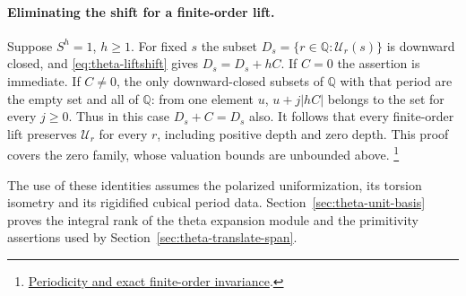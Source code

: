 \paragraph{Eliminating the shift for a finite-order lift.}
Suppose \(S^h=1\), \(h\ge1\). For fixed \(s\) the subset
\(D_s=\{r\in\mathbb Q:\mathcal U_r(s)\}\) is downward closed,
and \eqref{eq:theta-liftshift} gives \(D_s=D_s+hC\).
If \(C=0\) the assertion is immediate. If \(C\ne0\), the only
downward-closed subsets of \(\mathbb Q\) with that period are the
empty set and all of \(\mathbb Q\): from one element \(u\),
\(u+j|hC|\) belongs to the set for every \(j\ge0\). Thus in this
case \(D_s+C=D_s\) also. It follows that every finite-order
lift preserves \(\mathcal U_r\) for every \(r\), including positive
depth and zero depth. This proof covers the zero family, whose
valuation bounds are unbounded above.
\footnote{\href{https://github.com/ChristianKudeba/alpoge-rh-verification/blob/alpoge-source-7cbf7a0c/src/ReciprocityTheory/ReductiveGroups/ArithmeticGeometry/DiscreteValuationRings/PeriodicValuation.lean}{Periodicity and exact finite-order invariance}.}

The use of these identities assumes the polarized uniformization,
its torsion isometry and its rigidified cubical period data. Section~\ref{sec:theta-unit-basis} proves the integral rank of the
theta expansion module and the primitivity assertions used by
Section~\ref{sec:theta-translate-span}.
